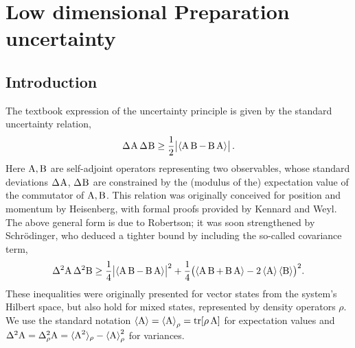 \let\textcircled=\pgftextcircled




%


\chapter{Low dimensional Preparation uncertainty}
\label{chap:low_dim_prep}



\section{Introduction}

The textbook expression of the uncertainty principle is given by the standard uncertainty relation,
\begin{equation}\label{eq:HUR}
  \sdev{\opa}\,\sdev{\opb}\ge \frac12\bigl| \expnr{\comm{\opa}{\opb}}\bigr|\,.
\end{equation}
Here $\operatorname{A},\operatorname{B}$ are self-adjoint operators representing two observables, whose standard deviations $\sdev{\opa}$, $\sdev{\opb}$ are constrained by the (modulus of the) expectation value of the commutator of $\operatorname{A},\operatorname{B}$. This relation was originally conceived for position and momentum by Heisenberg\cite{heisenberg-ur}, with formal proofs provided by Kennard\cite{kennard-ur} and Weyl\cite{weyl-ur}. The above general form is due to Robertson\cite{robertson-ur}; it was soon strengthened by Schr\"odinger\cite{schrodinger-ur}, who deduced a tighter bound by including the so-called covariance term,
\begin{equation}\label{eq:SUR}
  \var{\opa}\,\var{\opb}\ge\frac14\bigl| \expnr{\comm{\opa}{\opb}} \bigr|^2 + \frac14\bigl(\expnr{\acom\opa\opb}-2\expnr{\opa}\expnr{\opb}\bigr)^2.
\end{equation}
These inequalities were originally presented for vector states from the system's Hilbert space, but also hold for mixed states, represented by density operators $\rho$. We use the standard notation $\left\langle {\operatorname{A}}\right\rangle=\left\langle {\operatorname{A}}\right\rangle_\rho =\operatorname{tr}[\rho\operatorname{A}]$ for expectation values and $\var{\opa}=\varr{\opa}=\langle\opa^2\rangle_\rho-\expr{\opa}^2$ for variances. 

